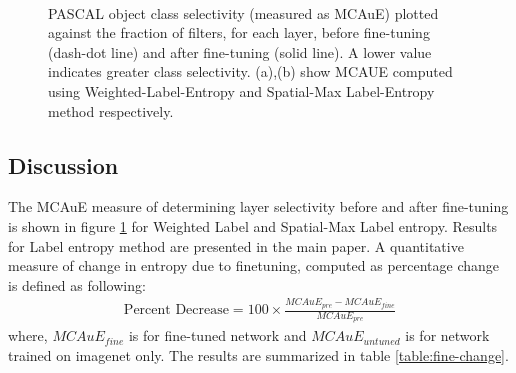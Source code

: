 \begin{figure}[t!]
\centering
{} \\
\caption{PASCAL object class selectivity (measured as MCAuE) plotted against the fraction of filters, for each layer, before fine-tuning (dash-dot line) and after fine-tuning (solid line). A lower value indicates greater class selectivity. (a),(b) show MCAUE computed using Weighted-Label-Entropy and Spatial-Max Label-Entropy method respectively.}
\label{fig:fine-entropy}
\end{figure}

\subsection{Discussion}
The MCAuE measure of determining layer selectivity before and after fine-tuning is shown in figure \ref{fig:fine-entropy} for Weighted Label and Spatial-Max Label entropy. Results for Label entropy method are presented in the main paper. A quantitative measure of change in entropy due to finetuning, computed as percentage change is defined as following:
\begin{eqnarray}
\text{Percent Decrease} = 100 \times \frac{MCAuE_{pre} - MCAuE_{fine}}{MCAuE_{pre}}
\end{eqnarray}
where, $MCAuE_{fine}$ is for fine-tuned network and $MCAuE_{untuned}$ is for network trained on imagenet only. The results are summarized in table \ref{table:fine-change}.
 
